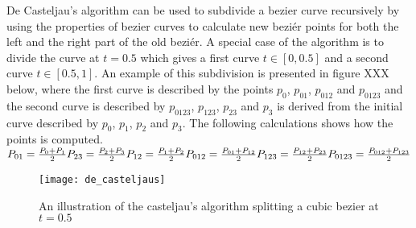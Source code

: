 De Casteljau’s algorithm can be used to subdivide a bezier curve recursively by using the properties of bezier curves to calculate new beziér points for both the left and the right part of the old beziér.\citep{fischer2000} A special case of the algorithm is to divide the curve at \begin{math}t=0.5\end{math} which gives a first curve \begin{math}t\in[0, 0.5]\end{math} and a second curve \begin{math}t\in[0.5, 1]\end{math}. An example of this subdivision is presented in figure XXX below, where the first curve is described by the points \begin{math}p_0\end{math}, \begin{math}p_{01}\end{math}, \begin{math}p_{012}\end{math} and \begin{math}p_{0123}\end{math} and the second curve is described by \begin{math}p_{0123}\end{math}, \begin{math}p_{123}\end{math}, \begin{math}p_{23}\end{math} and \begin{math}p_{3}\end{math} is derived from the initial curve described by \begin{math}p_{0}\end{math}, \begin{math}p_{1}\end{math}, \begin{math}p_{2}\end{math} and \begin{math}p_{3}\end{math}. The following calculations shows how the points is computed.\vspace{\baselineskip}\newline
\begin{math}
	P_{01}=\frac{P_0+P_1}{2}\newline
	P_{23}=\frac{P_2+P_3}{2}\newline
	P_{12}=\frac{P_1+P_2}{2}\newline
	P_{012}=\frac{P_{01}+P_{12}}{2}\newline
	P_{123}=\frac{P_{12}+P_{23}}{2}\newline
	P_{0123}=\frac{P_{012}+P_{123}}{2}
\end{math}\vspace{\baselineskip}\newline
\begin{figure}[H]
\texttt{[image: de\_casteljaus]}
\caption{An illustration of the casteljau's algorithm splitting a cubic bezier at $t=0.5$}
\end{figure}

